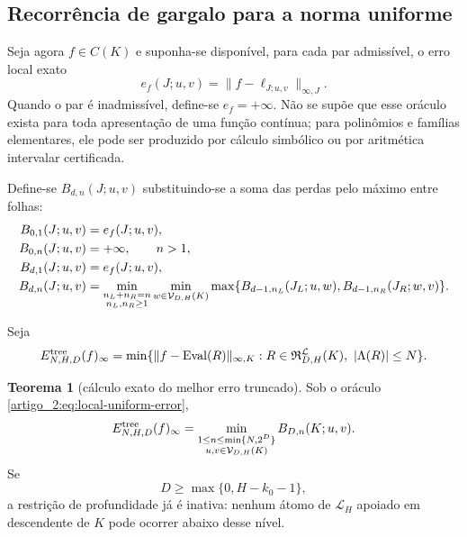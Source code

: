 \documentclass[12pt,a4paper]{article}
\theoremstyle{preciso}
\theoremstyle{definition}
\newcommand{\Eval}{\operatorname{Eval}}
\newcommand{\Library}{\mathcal{L}}
\newcommand{\Representations}{\mathfrak{R}}
\newcommand{\Values}{\mathcal{V}}
\theoremstyle{preciso}
\newtheorem{theorem}[teorema]{Teorema}
\theoremstyle{preciso}
\theoremstyle{preciso}
\theoremstyle{preciso}
\theoremstyle{definition}
\theoremstyle{preciso}
\theoremstyle{definition}
\theoremstyle{preciso}
\theoremstyle{preciso}
\theoremstyle{definition}
\begin{document}
\subsection{Recorrência de gargalo para a norma uniforme}

Seja agora $f\in C(K)$ e suponha-se disponível, para cada par admissível, o erro
local exato
\begin{equation}
 e_f(J;u,v)=\|f-\ell_{J;u,v}\|_{\infty,J}.
 \label{artigo_2:eq:local-uniform-error}
\end{equation}
Quando o par é inadmissível, define-se $e_f=+\infty$. Não se supõe que esse oráculo
exista para toda apresentação de uma função contínua; para polinômios e
famílias elementares, ele pode ser produzido por cálculo simbólico ou por
aritmética intervalar certificada.

Define-se $B_{d,n}(J;u,v)$ substituindo-se a soma das perdas pelo máximo entre folhas:
\begin{align}
 B_{0,1}(J;u,v)&=e_f(J;u,v),\label{artigo_2:eq:bottleneck-base}\\
 B_{0,n}(J;u,v)&=+\infty,\qquad n>1,\notag\\
 B_{d,1}(J;u,v)&=e_f(J;u,v),\label{artigo_2:eq:bottleneck-one}\\
 B_{d,n}(J;u,v)
 &=\min_{\substack{n_L+n_R=n\\n_L,n_R\ge1}}
 \min_{w\in\Values_{D,H}(K)}
 \max\{B_{d-1,n_L}(J_L;u,w),
       B_{d-1,n_R}(J_R;w,v)\}.
 \label{artigo_2:eq:bottleneck-recurrence}
\end{align}

Seja
\begin{equation}
 E_{N,H,D}^{\rm tree}(f)_\infty
 =\min\{\|f-\Eval(R)\|_{\infty,K}:
 R\in\Representations_{D,H}^{\Library}(K),\
 |\Lambda(R)|\le N\}.
 \label{artigo_2:eq:truncated-tree-error}
\end{equation}

\begin{theorem}[cálculo exato do melhor erro truncado]\label{map:artigo_2:8.2}
\label{artigo_2:thm:bottleneck}
Sob o oráculo \eqref{artigo_2:eq:local-uniform-error},
\begin{equation}
 E_{N,H,D}^{\rm tree}(f)_\infty
 =\min_{\substack{1\le n\le\min\{N,2^D\}\\
                  u,v\in\Values_{D,H}(K)}}
 B_{D,n}(K;u,v).
 \label{artigo_2:eq:bottleneck-optimum}
\end{equation}
Se
\begin{equation}
 D\ge \max\{0,H-k_0-1\},
 \label{artigo_2:eq:depth-inactive}
\end{equation}
a restrição de profundidade já é inativa: nenhum átomo de $\Library_H$
apoiado em descendente de $K$ pode ocorrer abaixo desse nível.
\end{theorem}
\end{document}
